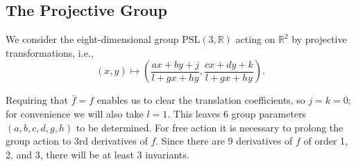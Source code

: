 \documentclass[review,onefignum,onetabnum]{siamonline190516}
\def\R{\mathbb{R}}
\begin{document}
{\subsection{The Projective Group}

We consider the eight-dimensional group $\mathrm{PSL}(3,\R)$ acting on $\R^2$ by projective transformations, i.e., 
\begin{equation}
(x,y) \mapsto \left(\frac{a x + b y + j}{l + g x + h y}, \frac{c x + d y + k}{l+ g x + h y}\right).
\end{equation}

Requiring that $\bar f = f$ enables us to clear the translation coefficients, so $j=k=0$; for convenience we will also take $l=1$. This leaves 6 group parameters $(a,b,c,d,g,h)$ to be determined. For free action it is necessary to prolong the group action to 3rd derivatives of $f$. Since there are 9 derivatives of $f$ of order 1, 2, and 3, there will be at least 3 invariants.

}
\end{document}
